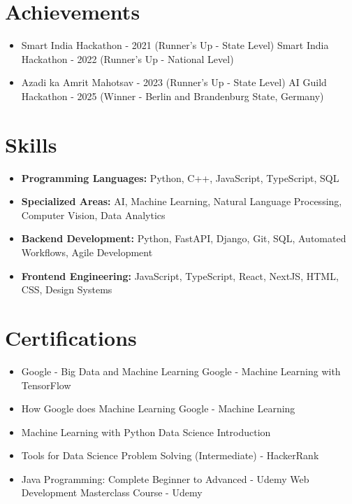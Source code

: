 \documentclass[a4paper,10pt]{article}
\begin{document}
\section*{Achievements}
\begin{itemize}
\item Smart India Hackathon - 2021 (Runner's Up - State Level) \hfill Smart India Hackathon - 2022 (Runner's Up - National Level)
\item Azadi ka Amrit Mahotsav - 2023 (Runner's Up - State Level) \hfill AI Guild Hackathon - 2025 (Winner - Berlin and Brandenburg State, Germany)
\end{itemize}

\section*{Skills}
\begin{itemize}
  \item \textbf{Programming Languages:} Python, C++, JavaScript, TypeScript, SQL
  \item \textbf{Specialized Areas:} AI, Machine Learning, Natural Language Processing, Computer Vision, Data Analytics
  \item \textbf{Backend Development:} Python, FastAPI, Django, Git, SQL, Automated Workflows, Agile Development
  \item \textbf{Frontend Engineering:} JavaScript, TypeScript, React, NextJS, HTML, CSS, Design Systems
\end{itemize}

\section*{Certifications}
\begin{itemize}
\item Google - Big Data and Machine Learning \hfill Google - Machine Learning with TensorFlow
\item How Google does Machine Learning \hfill Google - Machine Learning
\item Machine Learning with Python \hfill Data Science Introduction
\item Tools for Data Science \hfill Problem Solving (Intermediate) - HackerRank
\item Java Programming: Complete Beginner to Advanced - Udemy \hfill Web Development Masterclass Course - Udemy
\end{itemize}
\end{document}

